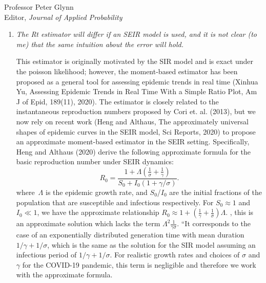 \documentclass[11pt]{letter} %
\begin{document}
\begin{letter}{Professor
	Peter Glynn\\
	Editor, {\em Journal of Applied Probability}}
\begin{enumerate}
\begin{enumerate}
	\vspace{5mm}
	\item {\it The Rt estimator will differ if an SEIR model is used, and it is not clear (to me) that the same intuition about the error will hold.}
	\vspace{5mm}


	This estimator is originally motivated by the SIR model and is exact under the poisson likelihood; however, the moment-based estimator has been proposed as a general tool for assessing epidemic trends in real time (Xinhua Yu, Assessing Epidemic Trends in Real Time With a Simple Ratio Plot, Am J of Epid, 189(11), 2020).  The estimator is closely related to the instantaneous reproduction numbers proposed by Cori et. al. (2013), but we now rely on recent work (Heng and Althaus, The approximately universal shapes of epidemic curves in the SEIR model, Sci Reports, 2020) to propose an approximate moment-based estimator in the SEIR setting. Specifically, Heng and Althaus (2020) derive the following approximate formula for the basic reproduction number under SEIR dynamics:
	$$
	R_0 = \frac{1 + \Lambda \left(\frac{1}{\sigma} + \frac{1}{\gamma} \right)}{S_0 + I_0 (1 + \gamma/\sigma)}.
	$$
	where~$\Lambda$ is the epidemic growth rate, and $S_0$/$I_0$ are the initial fractions of the population that are susceptible and infectious respectively.  For $S_0 \approx 1$ and $I_0 \ll 1$, we have the approximate relationship $R_0 \approx 1 + (\frac{1}{\gamma} + \frac{1}{\sigma})\Lambda$.
	, this is an approximate solution which lacks the term $\Lambda^2 \frac{1}{\gamma \sigma}$.  ``It corresponds to the case of an exponentially distributed generation time with mean duration $1/\gamma + 1/\sigma$, which is the same as the solution for the SIR model assuming an infectious period of $1/\gamma + 1/\sigma$. For realistic growth rates and choices of $\sigma$ and $\gamma$ for the COVID-19 pandemic, this term is negligible and therefore we work with the approximate formula.
	\vspace{5mm}


\end{enumerate}
\end{enumerate}
\end{letter}
\end{document}
